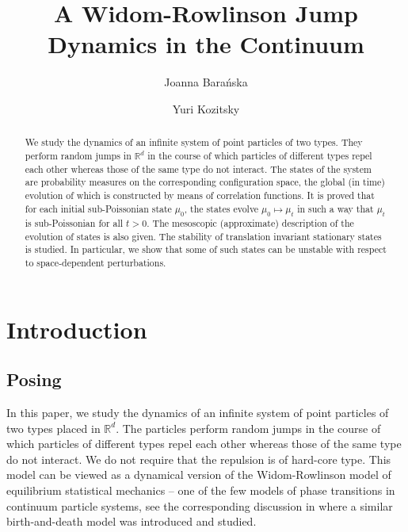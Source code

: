 \documentclass[reqno,11pt]{amsart}
\title{A Widom-Rowlinson Jump Dynamics in the Continuum}
\author{Joanna Bara{\'n}ska}
\author{ Yuri  Kozitsky}
\theoremstyle{definition}
\theoremstyle{remark}
\numberwithin{equation}{section}
\begin{document}

\begin{abstract}
We study the dynamics of an infinite system of point particles of
two types. They perform random jumps in $\mathds{R}^d$ in the course
of which particles of different types repel each other whereas those
of the same type do not interact. The states of the system are
probability measures on the corresponding configuration space, the
global (in time) evolution of which is constructed by means of
correlation functions. It is proved that for each initial
sub-Poissonian state $\mu_0$, the states evolve $\mu_0 \mapsto
\mu_t$ in such a way that $\mu_t$ is sub-Poissonian for all $t>0$.
The mesoscopic (approximate) description of the evolution of states
is also given. The stability of translation invariant stationary
states is studied. In particular, we show that some of such states
can be unstable with respect to space-dependent perturbations.

\end{abstract}
\maketitle

\section{Introduction}
\label{S1}

\subsection{Posing}
In this paper, we study the dynamics of an infinite system of point
particles of two types placed in $\mathds{R}^d$. The particles
perform random jumps in the course of which particles of different
types repel each other whereas those of the same type do not
interact. We do not require that the repulsion is of hard-core type.
This model can be viewed as a dynamical version of the
Widom-Rowlinson model \cite{WR} of equilibrium  statistical
mechanics  -- one of the few models of phase transitions in
continuum particle systems, see the corresponding discussion in
\cite{FKKO} where a similar birth-and-death model was introduced and
studied.
\end{document}
